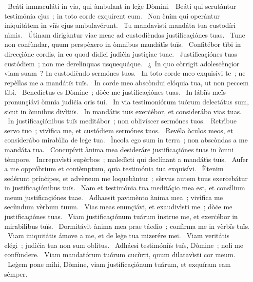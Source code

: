 ~Beáti immaculáti in via, qui àmbulant in leġe Dòmini. 
~Beáti qui scrutàntur testimónia ejus~; in toto corde exquírent eum. 
~Non ènim qui operàntur iniquitátem in viïs ejus ambulavérunt. 
~Tu mandavìsti mandáta tua custodíri nìmis. 
~Útinam dirigàntur viae meae ad custodièndas justificaçiónes tuas. 
~Tunc non confùndar, quum perspèxero in òmnibus mandátïs tuïs. 
~Confitébor tìbi in direcçióne cordis, in eo quod dìdici judìċia justìçiae tuae. 
~Justificaçiónes tuas custódiem~; non me derelìnquas usquequáque. 
~¿~In quo còrrigit adolesċènçior viam suam~? In custodièndo sermónes tuos. 
~In toto corde meo exquisívi te~; ne repèllas me a mandátïs tuïs. 
~In corde meo abscòndui elóquia tua, ut non peccem tìbi. 
~Benedìctus es Dòmine~; dòċe me justificaçiónes tuas. 
~In lábiïs meïs pronunçiávi òmnia judìċia oris tui. 
~In via testimoniórum tuórum delectátus sum, sicut in òmnibus divìtiïs. 
~In mandátïs tuïs exerċébor, et considerábo vias tuas. 
~In justificaçiónibus tuïs meditábor~; non oblivíscer sermónes tuos. 
~Retrìbue servo tuo~; vivìfica me, et custódiem sermónes tuos. 
~Revéla òculos meos, et considerábo mirabìlia de leġe tua. 
~Ìncola ego sum in terra~; non abscòndas a me mandáta tua. 
~Concupívit ànima mea desideráre justificaçiónes tuas in òmni tèmpore. 
~Increpavìsti supèrbos~; maledìcti qui declínant a mandátïs tuïs. 
~Aufer a me oppróbrium et contèmptum, quia testimónia tua exquisívi. 
~Ètenim sedérunt prínċipes, et advèrsum me loquebàntur~; sèrvus autem tuus exerċebátur in justificaçiónibus tuïs. 
~Nam et testimónia tua meditáçio mea est, et consìlium meum justificaçiónes tuae. 
~Adhaesit pavimènto ànima mea~; vivìfica me secùndum vèrbum tuum. 
~Vias meas enunçiávi, et exaudivìsti me~; dòċe me justificaçiónes tuas. 
~Viam justificaçiónum tuárum ìnstrue me, et exerċébor in mirabìlibus tuïs. 
~Dormitávit ànima mea prae táedio~; confìrma me in vèrbïs tuïs. 
~Viam iniquitátis ámove a me, et de leġe tua mizerére mei. 
~Viam veritátis elégi~; judìċia tua non sum oblítus. 
~Adháesi testimóniïs tuïs, Dòmine~; noli me confùndere. 
~Viam mandatórum tuórum cucùrri, quum dilatavìsti cor meum. 
~Leġem pone mìhi, Dòmine, viam justificaçiónum tuárum, et exquíram eam sèmper. 
